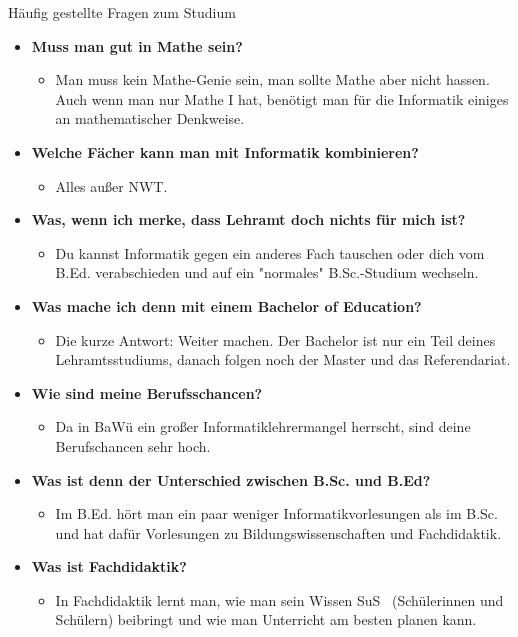 \begin{block}{Häufig gestellte Fragen zum Studium}
\begin{large}
\begin{itemize}
\item \textbf{Muss man gut in Mathe sein?}
\begin{itemize}
	\item Man muss kein Mathe-Genie sein, man sollte Mathe aber nicht hassen. Auch wenn man nur Mathe I hat, benötigt man für die Informatik einiges an mathematischer Denkweise.
\end{itemize}
\item \textbf{Welche Fächer kann man mit Informatik kombinieren?}
\begin{itemize}
	\item Alles außer NWT.
\end{itemize}
\item \textbf{Was, wenn ich merke, dass Lehramt doch nichts für mich ist?} 
\begin{itemize}
	\item Du kannst Informatik gegen ein anderes Fach tauschen oder dich vom B.Ed. verabschieden und auf ein "normales" B.Sc.-Studium wechseln.
\end{itemize}
\item \textbf{Was mache ich denn mit einem Bachelor of Education?} 
\begin{itemize}
	\item Die kurze Antwort: Weiter machen. Der Bachelor ist nur ein Teil deines Lehramtsstudiums, danach folgen noch der Master und das Referendariat.
\end{itemize}
\item \textbf{Wie sind meine Berufsschancen?} 
\begin{itemize}
	\item Da in BaWü ein großer Informatiklehrermangel herrscht, sind deine Berufschancen sehr hoch.
\end{itemize}
\item \textbf{Was ist denn der Unterschied zwischen B.Sc. und B.Ed?} 
\begin{itemize}
	\item Im B.Ed. hört man ein paar weniger Informatikvorlesungen als im B.Sc. und hat dafür Vorlesungen zu Bildungswissenschaften und Fachdidaktik.
\end{itemize}
\item \textbf{Was ist Fachdidaktik?} 
\begin{itemize}
	\item In Fachdidaktik lernt man, wie man sein Wissen SuS~ (Schülerinnen und Schülern) beibringt und wie man Unterricht am besten planen kann.
\end{itemize}


\end{itemize}
\end{large}
\end{block}
